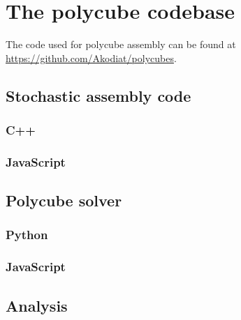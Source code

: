 

\chapter{The polycube codebase}
\label{ch:appendix_polycubes}

\minitoc

The code used for polycube assembly can be found at \url{https://github.com/Akodiat/polycubes}.

\section{Stochastic assembly code}

\subsection{C++}

\subsection{JavaScript}

\section{Polycube solver}

\subsection{Python}

\subsection{JavaScript}

\section{Analysis}

